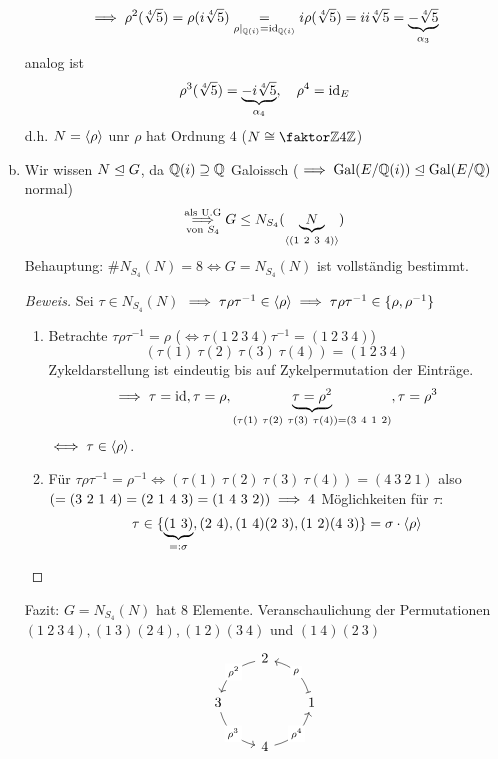 \documentclass[a4paper]{report}
\begin{document}
\begin{bsp}
\begin{enumerate}[(a)]
          \[\implies \rho^{2}(\sqrt[4]5) = \rho(i\sqrt[4]5) \underset{\rho|_{\mathbb{Q}(i)}=\operatorname{id}_{\mathbb{Q}(i)}} = i\rho(\sqrt[4]5) = i i \sqrt[4]5 = \underbrace{-\sqrt[4]5}_{\alpha_{3}}\]
          analog ist
          \[\rho^{3}(\sqrt[4]5) = \underbrace{-i \sqrt[4]5}_{\alpha_{4}},\quad \rho^{4} = \operatorname{id}_{E}\]
          d.h. $N = \langle\rho\rangle$ unr $\rho$ hat Ordnung $4$ ($N \cong \fak \Z{4\Z}$)
    \item Wir wissen $N \trianglelefteq G$, da $\mathbb{Q}(i) \supseteq \mathbb{Q}$ Galoissch ($\implies \operatorname{Gal}(E/\mathbb{Q}(i)) \trianglelefteq \operatorname{Gal}(E/\mathbb{Q})$ normal) \[\overunderset{\text{als U.G}}{\text{von }S_{4}}\imp G \le N_{S_{4}}(\ubr{N}_{\<(1\ 2\ 3\ 4)\>})\]
          Behauptung: $\#N_{S_{4}}(N) = 8 \iff G = N_{S_{4}}(N)$ ist vollständig bestimmt.
          \begin{proof}[Beweis]
            Sei $\tau \in N_{S_{4}}(N)$ $\implies \tau \rho \tau^{-1} \in \langle\rho\rangle \implies \tau \rho \tau^{-1} \in \{\rho, \rho^{-1}\}$
\begin{enumerate}[{Fall} 1:]
  \item Betrachte $\tau \rho \tau^{-1} = \rho$ ($\iff \tau(1\ 2\ 3\ 4)\tau^{-1} = (1\ 2\ 3\ 4)$)
        \[(\tau(1)\ \tau(2) \ \tau(3)\ \tau(4)) = (1\ 2\ 3\ 4)\]
        Zykeldarstellung ist eindeutig bis auf Zykelpermutation der Einträge.
        \[\implies \tau = \operatorname{id}, \tau = \rho, \underbrace{\tau = \rho^{2}}_{(\tau(1)\ \tau(2) \ \tau(3)\ \tau(4)) = (3\ 4\ 1\ 2)} , \tau = \rho^{3}\]
        $\iff \tau \in \langle\rho\rangle$.
  \item Für $\tau \rho \tau^{-1} = \rho^{-1} \iff (\tau(1)\ \tau(2) \ \tau(3)\ \tau(4)) = (4\ 3\ 2\ 1)$ also $( = (3\ 2\ 1\ 4) = (2\ 1\ 4\ 3) = (1\ 4\ 3\ 2) ) \imp 4$ Möglichkeiten für $\tau:$
        \[\tau \in \{\ubr{(1\ 3)}_{=:\s}, (2\ 4), (1\ 4)(2\ 3), (1\ 2)(4\ 3)\} = \s \cd \<\rho\>\]
\end{enumerate}
          \end{proof}
Fazit: $G = N_{S_{4}}(N)$ hat 8 Elemente. Veranschaulichung der Permutationen $(1\ 2\ 3\ 4), (1\ 3)(2\ 4), (1\ 2)(3\ 4)$ und $(1\ 4)(2\ 3)$
\[
  \begin{tikzcd}[column sep = 20]
                                               & 2 \arrow[ld, "\rho^2" description, bend right] &                                                       \\
3 \arrow[rd, "\rho^3" description, bend right] &                                                & 1 \arrow[lu, "\rho" description, maps to, bend right] \\
                                               & 4 \arrow[ru, "\rho^4" description, bend right] &
                                             \end{tikzcd}
\]
\end{enumerate}
\end{bsp}
\end{document}
